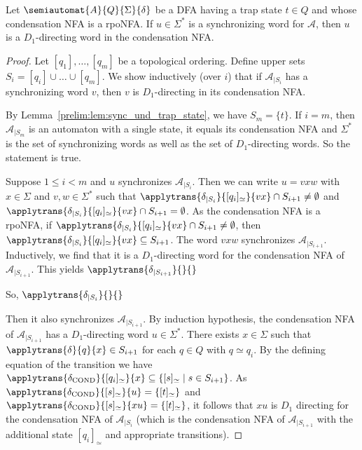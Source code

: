 \begin{proposition}
 Let $\semiautomat{A}{Q}{\Sigma}{\delta}$ be a DFA having a trap state $t \in Q$
 and whose condensation NFA is a rpoNFA.
 If $u \in \Sigma^*$ is a synchronizing word for $\mathcal A$,
 then $u$ is a $D_1$-directing word in the condensation NFA.
\end{proposition}
\begin{proof}
 Let $[q_1], \ldots, [q_m]$ be a topological ordering.
 Define upper sets $S_i = [q_i] \cup \ldots \cup [q_m]$.
 We show inductively (over $i$) that if $\mathcal A_{|S_i}$
 has a synchronizing word $v$, then $v$ is $D_1$-directing in its condensation NFA.
 
 
 By Lemma~\ref{prelim:lem:sync_und_trap_state}, 
 we have $S_m = \{t\}$.
 If $i = m$, then $\mathcal A_{|S_m}$ is an automaton with a single state,
 it equals its condensation NFA and $\Sigma^*$ is the set of synchronizing
 words as well as the set of $D_1$-directing words.
 So the statement is true.
 
 
 
 Suppose $1 \le i < m$ and $u$ synchronizes $\mathcal A_{|S_i}$.
 Then we can write $u = vxw$ with $x \in \Sigma$ and $v,w \in \Sigma^*$
 such that $\applytrans{\delta_{|S_i}}{[q_i]_{\simeq}}{vx} \cap S_{i+1} \ne \emptyset$
 and $\applytrans{\delta_{|S_i}}{[q_i]_{\simeq}}{vx} \cap S_{i+1} = \emptyset$.
 As the condensation NFA is a rpoNFA, 
 if $\applytrans{\delta_{|S_i}}{[q_i]_{\simeq}}{vx} \cap S_{i+1} \ne \emptyset$,
 then $\applytrans{\delta_{|S_i}}{[q_i]_{\simeq}}{vx} \subseteq S_{i+1}$.
 The word $vxw$ synchronizes $\mathcal A_{|S_{i+1}}$.
 Inductively, we find that it is a $D_1$-directing word 
 for the condensation NFA of $\mathcal A_{|S_{i+1}}$.
 This yields $\applytrans{\delta_{|S_{i+1}}}{}{}$
 
 
 
 So, $\applytrans{\delta_{|S_i}}{}{}$
 
 
 
 Then it also synchronizes $\mathcal A_{|S_{i+1}}$.
 By induction hypothesis, the condensation NFA of $\mathcal A_{|S_{i+1}}$
 has a $D_1$-directing word $u \in \Sigma^*$.
 There  
 exists $x \in \Sigma$ such that $\applytrans{\delta}{q}{x} \in S_{i+1}$ %
 for each $q \in Q$ with $q \simeq q_i$.
 By the defining equation of the transition 
 we have $\applytrans{\delta_{\text{COND}}}{[q_i]_{\simeq}}{x} \subseteq \{ [s]_{\simeq} \mid s \in S_{i+1} \}$.
 As $\applytrans{\delta_{\text{COND}}}{[s]_{\simeq}}{u} = \{ [t]_{\simeq} \}$
 and $\applytrans{\delta_{\text{COND}}}{[s]_{\simeq}}{xu} = \{ [t]_{\simeq} \}$, 
 it follows that $xu$ is $D_1$ directing for the condensation NFA of $\mathcal A_{|S_i}$
 (which is the condensation NFA of $\mathcal A_{|S_{i+1}}$
 with the additional state $[q_i]_{\simeq}$ and appropriate transitions).
\end{proof}
